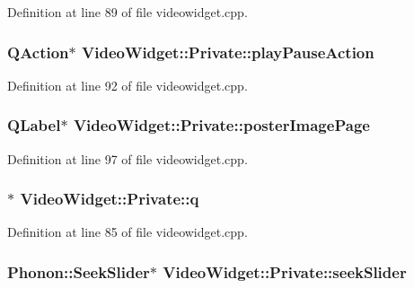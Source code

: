 Definition at line 89 of file videowidget.\+cpp.

\hypertarget{classVideoWidget_1_1Private_a573e20300c27f08b5d9f4bcff46d21ce}{
\subsubsection[{play\+Pause\+Action}]{\setlength{\rightskip}{0pt plus 5cm}Q\+Action$\ast$ Video\+Widget\+::\+Private\+::play\+Pause\+Action}}\label{classVideoWidget_1_1Private_a573e20300c27f08b5d9f4bcff46d21ce}


Definition at line 92 of file videowidget.\+cpp.

\hypertarget{classVideoWidget_1_1Private_a68a1e9357ce7c092b82ae61860d68ed3}{
\subsubsection[{poster\+Image\+Page}]{\setlength{\rightskip}{0pt plus 5cm}Q\+Label$\ast$ Video\+Widget\+::\+Private\+::poster\+Image\+Page}}\label{classVideoWidget_1_1Private_a68a1e9357ce7c092b82ae61860d68ed3}


Definition at line 97 of file videowidget.\+cpp.

\hypertarget{classVideoWidget_1_1Private_ac4360af14b1cdb4912d507cbb3a941a8}{
\subsubsection[{q}]{$\ast$ Video\+Widget\+::\+Private\+::q}}\label{classVideoWidget_1_1Private_ac4360af14b1cdb4912d507cbb3a941a8}


Definition at line 85 of file videowidget.\+cpp.

\hypertarget{classVideoWidget_1_1Private_a70e31cd6bc6216e372c80b62684f2dcf}{
\subsubsection[{seek\+Slider}]{\setlength{\rightskip}{0pt plus 5cm}Phonon\+::\+Seek\+Slider$\ast$ Video\+Widget\+::\+Private\+::seek\+Slider}}\label{classVideoWidget_1_1Private_a70e31cd6bc6216e372c80b62684f2dcf}


